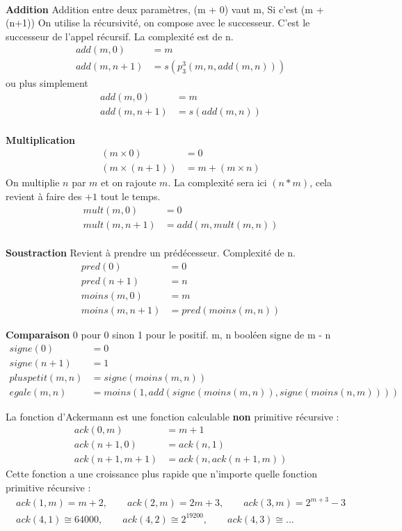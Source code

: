 \begin{myexem}\ \\
	\textbf{Addition}
	Addition entre deux paramètres, (m + 0) vaut m,
	Si c’est (m + (n+1)) On utilise la récursivité, on compose avec le successeur. C’est le successeur de l’appel récursif.
	La complexité est de n.
	\begin{align*}
		add (m, 0) &= m \\
		add (m, n+1) &= s (p^3_3(m, n, add (m, n)))
	\end{align*}
	ou plus simplement
	\begin{align*}
		add (m, 0) &= m \\
		add (m, n+1) &= s (add (m, n))
	\end{align*}
	\\
	\textbf{Multiplication}
	\begin{align*}
	(m\times 0) &= 0\\
	(m \times (n+1)) &= m + (m\times n)
	\end{align*}
	On multiplie $n$ par $m$ et on rajoute $m$. La complexité sera ici $(n*m)$, cela revient à faire des $+1$ tout le temps.
	\begin{align*}
	mult (m, 0) &= 0 \\
	mult (m, n+1) &= add (m, mult(m, n))
	\end{align*}
	\\
	\textbf{Soustraction} Revient à prendre un prédécesseur.
	Complexité de n. 
	\begin{align*}
	pred (0) &= 0 \\
	pred (n+1) &= n \\
	moins (m, 0) &= m \\
	moins (m, n+1) &= pred (moins (m, n))
	\end{align*}
	
	\textbf{Comparaison} 0 pour 0 sinon 1 pour le positif.
	m, n booléen signe de m - n
	\begin{align*}
	signe (0) &= 0 \\
	signe (n+1) &= 1 \\
	pluspetit (m, n) &= signe(moins(m, n)) \\
	egale (m, n) &= moins (1, add(signe (moins (m, n)), signe (moins (n, m))))
	\end{align*}
\end{myexem}


\begin{myexem}
	La fonction d'Ackermann est une fonction calculable \textbf{non}
	primitive récursive :
	\begin{align*}
		ack(0,m) &= m+1 \\
		ack(n+1,0) &= ack(n,1)\\
		ack(n+1,m+1) &= ack(n, ack(n+1,m))
	\end{align*}
	Cette fonction a une croissance plus rapide que n'importe quelle fonction
	primitive récursive :
	\begin{align*}
		ack(1,m) = m+2,\qquad ack(2,m) = 2m+3,\qquad ack(3,m)=2^{m+3}-3\\
		ack(4,1) \cong 64 000,\qquad ack(4,2) \cong 2^{19200},\qquad ack(4,3) \cong \dots
	\end{align*}
\end{myexem}


